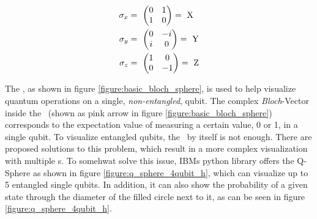 \begin{equation}
    \centering
    \begin{split}
        \sigma_x &=\ \begin{pmatrix}0 & 1 \\ 1 & 0\end{pmatrix} =\ \mathrm{X}\\
        \sigma_y &=\ \begin{pmatrix}0 & -i \\ i & 0\end{pmatrix} =\ \mathrm{Y}\\
        \sigma_z &=\ \begin{pmatrix}1 & 0 \\ 0 & -1\end{pmatrix} =\ \mathrm{Z}\\
    \end{split}
    \label{equation:pauli_matrices}
\end{equation}

\newpage

The \bloch\cite{michael_a_nielsen_quantum_2000}, as shown in figure \ref{figure:basic_bloch_sphere}, is used to help visualize quantum operations on a single, \emph{non-entangled}, qubit. The complex \emph{Bloch}-Vector inside the \bloch\ (shown as pink arrow in figure \ref{figure:basic_bloch_sphere}) corresponds to the expectation value of measuring a certain value, 0 or 1, in a single qubit. To visualize entangled qubits, the \bloch\ by itself is not enough. There are proposed solutions to this problem\cite{gamel_entangled_2016}, which result in a more complex visualization with multiple \bloch s. To somehwat solve this issue, IBMs python library  offers the Q-Sphere\cite{ibm_quantum_visualizations_nodate} as shown in figure \ref{figure:q_sphere_4qubit_h}, which can visualize up to 5 entangled single qubits. In addition, it can also show the probability of a given state through the diameter of the filled circle next to it, as can be seen in figure \ref{figure:q_sphere_4qubit_h}.

